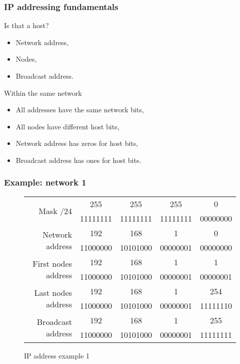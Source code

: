   \begin{frame}
    \frametitle{IP addressing fundamentals}
    \begin{block}{Is that a host?}
      \begin{itemize}
        \item Network address,\pause
        \item Nodes,\pause
        \item Broadcast address.\pause
      \end{itemize}
    \end{block}
    \begin{block}{Within the same network}
      \begin{itemize}
        \item All addresses have the same network bits,\pause
        \item All nodes have different host bits,\pause
        \item Network address has zeros for host bits,\pause
        \item Broadcast address has ones for host bits.
      \end{itemize}
    \end{block}
  \end{frame}

  \begin{frame}
    \frametitle{Example: network 1}
    \begin{figure}
        \centering
      \begin{tabular}{|r|cccc|}
        \hline
        \multirow{2}{*}{Mask /24} & {\color{brown}255} & {\color{brown}255} & {\color{brown}255} & {\color{brown}0} \\
        & {\color{brown}11111111} & {\color{brown}11111111} & {\color{brown}11111111} & {\color{brown}00000000} \\ \hline
        \multirow{2}{*}{Network address} & \color{brown}192 & \color{brown}168 & \color{brown}1 & \color{blue}0 \\
        & \color{brown}11000000 & \color{brown}10101000 & \color{brown}00000001 & \color{blue}00000000 \\ \hline
        \multirow{2}{*}{First nodes address} & \color{brown}192 & \color{brown}168 & \color{brown}1 & \color{blue}1 \\
        & \color{brown}11000000 & \color{brown}10101000 & \color{brown}00000001 & \color{blue}00000001 \\ \hline
        \multirow{2}{*}{Last nodes address} & \color{brown}192 & \color{brown}168 & \color{brown}1 & \color{blue}254 \\
        & \color{brown}11000000 & \color{brown}10101000 & \color{brown}00000001 & \color{blue}11111110 \\ \hline
        \multirow{2}{*}{Broadcast address} & \color{brown}192 & \color{brown}168 & \color{brown}1 & \color{blue}255 \\
        & \color{brown}11000000 & \color{brown}10101000 & \color{brown}00000001 & \color{blue}11111111 \\ \hline
      \end{tabular}
      \caption{IP address example 1}
    \end{figure}
  \end{frame}


